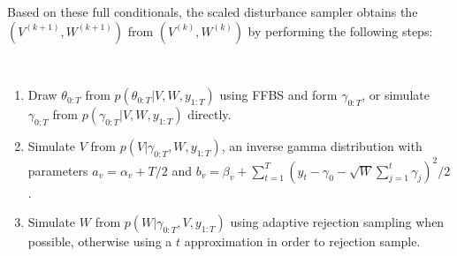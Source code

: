 Based on these full conditionals, the scaled disturbance sampler obtains the $(V^{(k+1)},W^{(k+1)})$ from $(V^{(k)},W^{(k)})$ by performing the following steps:
\begin{alg}\mbox{}\\[-\baselineskip]
\begin{enumerate}\label{distalg}
  \item Draw $\theta_{0:T}$ from $p(\theta_{0:T}|V,W,y_{1:T})$
    using FFBS and form $\gamma_{0:T}$, or simulate $\gamma_{0:T}$ from $p(\gamma_{0:T}|V,W,y_{1:T})$ directly.
  \item Simulate $V$ from $p(V|\gamma_{0:T},W,y_{1:T})$, an inverse gamma distribution with parameters $a_v = \alpha_v + T/2$ and $b_v = \beta_v + \sum_{t=1}^T(y_t-\gamma_0 -\sqrt{W}\sum_{j=1}^t\gamma_j)^2/2$.
  \item Simulate $W$ from $p(W|\gamma_{0:T},V,y_{1:T})$ using adaptive rejection sampling when possible, otherwise using a $t$ approximation in order to rejection sample. 
\end{enumerate}
\end{alg}

